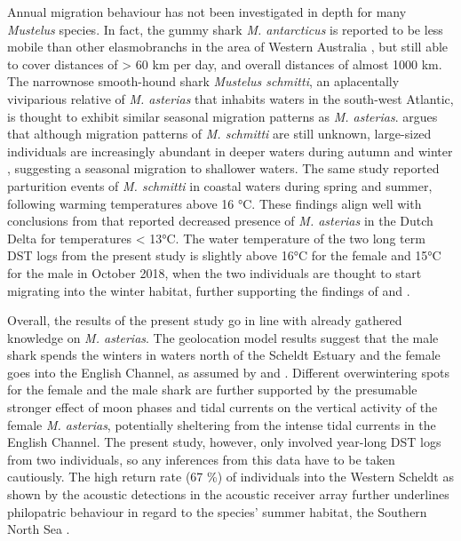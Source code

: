 \documentclass[
  authoryear,
  review,
  3p]{elsarticle}
\begin{document}
Annual migration behaviour has not been investigated in depth for many
\emph{Mustelus} species. In fact, the gummy shark \emph{M. antarcticus}
is reported to be less mobile than other elasmobranchs in the area of
Western Australia \citep[according to a three-year acoustic monitoring
study involving 100 tagged \emph{M. antarcticus},][]{braccini_2017}, but
still able to cover distances of \textgreater{} 60 km per day, and
overall distances of almost 1000 km. The narrownose smooth-hound shark
\emph{Mustelus schmitti}, an aplacentally viviparious relative of
\emph{M. asterias} that inhabits waters in the south-west Atlantic, is
thought to exhibit similar seasonal migration patterns as \emph{M.
asterias}. \citet{elisio_2019} argues that although migration patterns
of \emph{M. schmitti} are still unknown, large-sized individuals are
increasingly abundant in deeper waters during autumn and winter
\citep{cortes_2011}, suggesting a seasonal migration to shallower
waters. The same study reported parturition events of \emph{M. schmitti}
in coastal waters during spring and summer, following warming
temperatures above 16 °C. These findings align well with conclusions
from \citet{breve_2016} that reported decreased presence of \emph{M.
asterias} in the Dutch Delta for temperatures \textless{} 13°C. The
water temperature of the two long term DST logs from the present study
is slightly above 16°C for the female and 15°C for the male in October
2018, when the two individuals are thought to start migrating into the
winter habitat, further supporting the findings of \citet{breve_2016}
and \citet{elisio_2019}.

Overall, the results of the present study go in line with already
gathered knowledge on \emph{M. asterias}. The geolocation model results
suggest that the male shark spends the winters in waters north of the
Scheldt Estuary and the female goes into the English Channel, as assumed
by \citet{breve_2020} and \citet{griffiths_2020}. Different
overwintering spots for the female and the male shark are further
supported by the presumable stronger effect of moon phases and tidal
currents on the vertical activity of the female \emph{M. asterias},
potentially sheltering from the intense tidal currents in the English
Channel. The present study, however, only involved year-long DST logs
from two individuals, so any inferences from this data have to be taken
cautiously. The high return rate (67 \%) of individuals into the Western
Scheldt as shown by the acoustic detections in the acoustic receiver
array further underlines philopatric behaviour in regard to the species'
summer habitat, the Southern North Sea \citep{griffiths_2020}.
\end{document}
